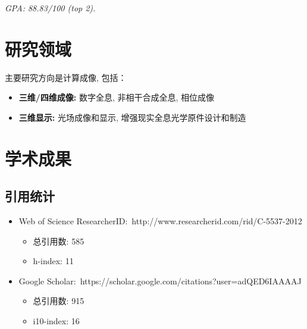 \documentclass[10pt,a4paper]{moderncv}
\begin{document}
{\textit{GPA: 88.83/100 (top 2).}}{}

\section{研究领域}
主要研究方向是计算成像, 包括：
\begin{itemize}
\item \textbf{三维/四维成像:} 数字全息, 非相干合成全息, 相位成像
\item \textbf{三维显示:} 光场成像和显示, 增强现实全息光学原件设计和制造
\end{itemize}

\section{学术成果}
\subsection{引用统计}
\begin{itemize}
\item Web of Science ResearcherID:~{http://www.researcherid.com/rid/C-5537-2012}
	\begin{itemize}
	\item 总引用数: 585
	\item h-index: 11
	\end{itemize}
\item Google Scholar:~{https://scholar.google.com/citations?user=adQED6IAAAAJ}
	\begin{itemize}
	\item 总引用数: 915
	\item i10-index: 16
	\end{itemize}
\end{itemize}

\end{document}
